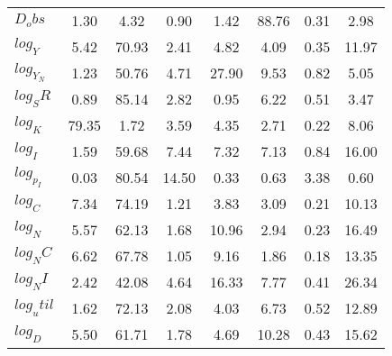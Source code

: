 \begin{center}
\begin{longtable}{lccccccc}
$D_obs     $	 & 	        1.30	 & 	        4.32	 & 	        0.90	 & 	        1.42	 & 	       88.76	 & 	        0.31	 & 	        2.98 \\ 
$log_Y     $	 & 	        5.42	 & 	       70.93	 & 	        2.41	 & 	        4.82	 & 	        4.09	 & 	        0.35	 & 	       11.97 \\ 
$log_Y_N   $	 & 	        1.23	 & 	       50.76	 & 	        4.71	 & 	       27.90	 & 	        9.53	 & 	        0.82	 & 	        5.05 \\ 
$log_SR    $	 & 	        0.89	 & 	       85.14	 & 	        2.82	 & 	        0.95	 & 	        6.22	 & 	        0.51	 & 	        3.47 \\ 
$log_K     $	 & 	       79.35	 & 	        1.72	 & 	        3.59	 & 	        4.35	 & 	        2.71	 & 	        0.22	 & 	        8.06 \\ 
$log_I     $	 & 	        1.59	 & 	       59.68	 & 	        7.44	 & 	        7.32	 & 	        7.13	 & 	        0.84	 & 	       16.00 \\ 
$log_p_I   $	 & 	        0.03	 & 	       80.54	 & 	       14.50	 & 	        0.33	 & 	        0.63	 & 	        3.38	 & 	        0.60 \\ 
$log_C     $	 & 	        7.34	 & 	       74.19	 & 	        1.21	 & 	        3.83	 & 	        3.09	 & 	        0.21	 & 	       10.13 \\ 
$log_N     $	 & 	        5.57	 & 	       62.13	 & 	        1.68	 & 	       10.96	 & 	        2.94	 & 	        0.23	 & 	       16.49 \\ 
$log_NC    $	 & 	        6.62	 & 	       67.78	 & 	        1.05	 & 	        9.16	 & 	        1.86	 & 	        0.18	 & 	       13.35 \\ 
$log_NI    $	 & 	        2.42	 & 	       42.08	 & 	        4.64	 & 	       16.33	 & 	        7.77	 & 	        0.41	 & 	       26.34 \\ 
$log_util  $	 & 	        1.62	 & 	       72.13	 & 	        2.08	 & 	        4.03	 & 	        6.73	 & 	        0.52	 & 	       12.89 \\ 
$log_D     $	 & 	        5.50	 & 	       61.71	 & 	        1.78	 & 	        4.69	 & 	       10.28	 & 	        0.43	 & 	       15.62 \\ 
\end{longtable}
 \end{center}
